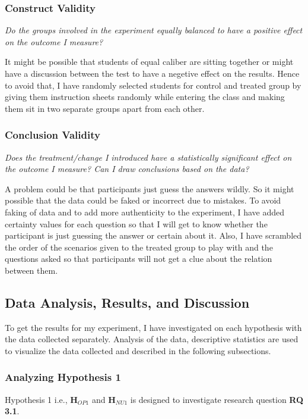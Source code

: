 \subsubsection{Construct Validity}\label{subsubsec:constructvalidity}
\emph{Do the groups involved in the experiment equally balanced to have a positive effect on the outcome I measure?}

\medskip
\noindent It might be possible that students of equal caliber are sitting together or might have a discussion between the test to have a negetive effect on the results. Hence to avoid that, I have randomly selected students for control and treated group by giving them instruction sheets randomly while entering the class and making them sit in two separate groups apart from each other.

\subsubsection{Conclusion Validity}\label{subsubsec:conclusionvalidity}
\emph{Does the treatment/change I introduced have a statistically significant effect on the outcome I measure? Can I draw conclusions based on the data?}
	
\medskip
\noindent A problem could be that participants just guess the answers wildly. So it might possible that the data could be faked or incorrect due to mistakes. To avoid faking of data and to add more authenticity to the experiment, I have added certainty values for each question so that I will get to know whether the participant is just guessing the answer or certain about it. Also, I have scrambled the order of the scenarios given to the treated group to play with and the questions asked so that participants will not get a clue about the relation between them.

\subsection{Data Analysis, Results, and Discussion}\label{subsec:results}
To get the results for my experiment, I have investigated on each hypothesis with the data collected separately. Analysis of the data, descriptive statistics are used to visualize the data collected and described in the following subsections.

\subsubsection{Analyzing Hypothesis 1}\label{subsubsec:hypothesis1}
Hypothesis 1 i.e., \textbf{H$_{OP1}$} and \textbf{H$_{NU1}$} is designed to investigate research question \textbf{RQ 3.1}.
